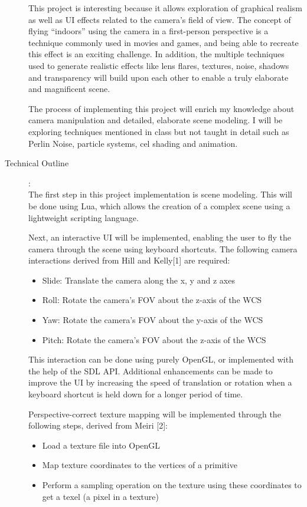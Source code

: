 \documentclass {article}
\begin{document}
\begin{description}
    This project is interesting because it allows exploration of graphical realism as well as UI effects related to the camera’s field of view. The concept of flying “indoors” using the camera in a first-person perspective is a technique commonly used in movies and games, and being able to recreate this effect is an exciting challenge. In addition, the multiple techniques used to generate realistic effects like lens flares, textures, noise, shadows and transparency will build upon each other to enable a truly elaborate and magnificent scene.

    The process of implementing this project will enrich my knowledge about camera manipulation and detailed, elaborate scene modeling. I will be exploring techniques mentioned in class but not taught in detail such as Perlin Noise, particle systems, cel shading and animation.

\item[Technical Outline]:\\
    The first step in this project implementation is scene modeling. This will be done using Lua, which allows the creation of a complex scene using a lightweight scripting language.

    Next, an interactive UI will be implemented, enabling the user to fly the camera through the scene using keyboard shortcuts. The following camera interactions derived from Hill and Kelly[1] are required:

\begin{itemize}
    \item Slide: Translate the camera along the x, y and z axes
    \item Roll: Rotate the camera’s FOV about the z-axis of the WCS
    \item Yaw: Rotate the camera’s FOV about the y-axis of the WCS
    \item Pitch: Rotate the camera’s FOV about the z-axis of the WCS
\end{itemize}

    This interaction can be done using purely OpenGL, or implemented with the help of the SDL API. Additional enhancements can be made to improve the UI by increasing the speed of translation or rotation when a keyboard shortcut is held down for a longer period of time.

    Perspective-correct texture mapping will be implemented through the following steps, derived from Meiri [2]:

\begin{itemize}
    \item Load a texture file into OpenGL
    \item Map texture coordinates to the vertices of a primitive
    \item Perform a sampling operation on the texture using these coordinates to get a texel (a pixel in a texture)
\end{itemize}


\end{description}
\end{document}
